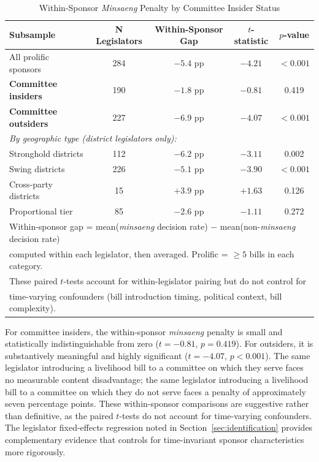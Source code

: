 \documentclass[11pt]{article}
\begin{document}
\begin{table}[htbp]
\centering
\caption{Within-Sponsor \emph{Minsaeng} Penalty by Committee Insider Status}
\label{tab:within}
\begin{tabular}{lcccc}
\toprule
Subsample & N Legislators & Within-Sponsor Gap & $t$-statistic & $p$-value \\
\midrule
All prolific sponsors & 284 & $-5.4$ pp & $-4.21$ & $<0.001$ \\
\textbf{Committee insiders} & 190 & $-1.8$ pp & $-0.81$ & 0.419 \\
\textbf{Committee outsiders} & 227 & $-6.9$ pp & $-4.07$ & $<0.001$ \\
\midrule
\multicolumn{5}{l}{\textit{By geographic type (district legislators only):}} \\
\quad Stronghold districts & 112 & $-6.2$ pp & $-3.11$ & 0.002 \\
\quad Swing districts & 226 & $-5.1$ pp & $-3.90$ & $<0.001$ \\
\quad Cross-party districts & 15 & $+3.9$ pp & $+1.63$ & 0.126 \\
\quad Proportional tier & 85 & $-2.6$ pp & $-1.11$ & 0.272 \\
\bottomrule
\multicolumn{5}{l}{\footnotesize Within-sponsor gap = mean(\emph{minsaeng} decision rate) $-$ mean(non-\emph{minsaeng} decision rate)} \\
\multicolumn{5}{l}{\footnotesize computed within each legislator, then averaged. Prolific = $\geq5$ bills in each category.} \\
\multicolumn{5}{l}{\footnotesize These paired $t$-tests account for within-legislator pairing but do not control for} \\
\multicolumn{5}{l}{\footnotesize time-varying confounders (bill introduction timing, political context, bill complexity).} \\
\end{tabular}
\end{table}

For committee insiders, the within-sponsor \emph{minsaeng} penalty is small and statistically indistinguishable from zero ($t = -0.81$, $p = 0.419$). For outsiders, it is substantively meaningful and highly significant ($t = -4.07$, $p < 0.001$). The same legislator introducing a livelihood bill to a committee on which they serve faces no measurable content disadvantage; the same legislator introducing a livelihood bill to a committee on which they do not serve faces a penalty of approximately seven percentage points. These within-sponsor comparisons are suggestive rather than definitive, as the paired $t$-tests do not account for time-varying confounders. The legislator fixed-effects regression noted in Section~\ref{sec:identification} provides complementary evidence that controls for time-invariant sponsor characteristics more rigorously.
\end{document}
